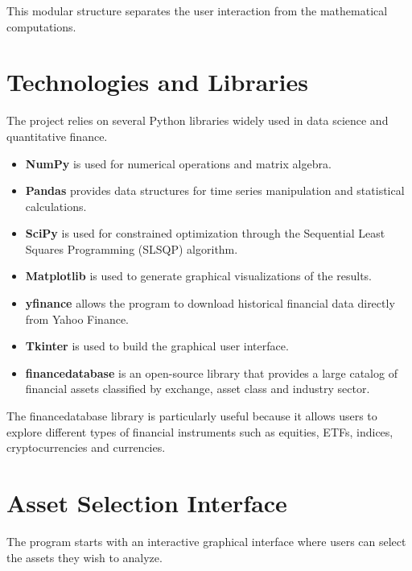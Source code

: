 \documentclass[11pt,a4paper]{article}
\begin{document}
This modular structure separates the user interaction from the mathematical computations.

\section{Technologies and Libraries}

The project relies on several Python libraries widely used in data science and quantitative finance.

\begin{itemize}

\item \textbf{NumPy} is used for numerical operations and matrix algebra.

\item \textbf{Pandas} provides data structures for time series manipulation and statistical calculations.

\item \textbf{SciPy} is used for constrained optimization through the Sequential Least Squares Programming (SLSQP) algorithm.

\item \textbf{Matplotlib} is used to generate graphical visualizations of the results.

\item \textbf{yfinance} allows the program to download historical financial data directly from Yahoo Finance.

\item \textbf{Tkinter} is used to build the graphical user interface.

\item \textbf{financedatabase} is an open-source library that provides a large catalog of financial assets classified by exchange, asset class and industry sector.

\end{itemize}

The financedatabase library is particularly useful because it allows users to explore different types of financial instruments such as equities, ETFs, indices, cryptocurrencies and currencies.

\section{Asset Selection Interface}

The program starts with an interactive graphical interface where users can select the assets they wish to analyze.
\end{document}
